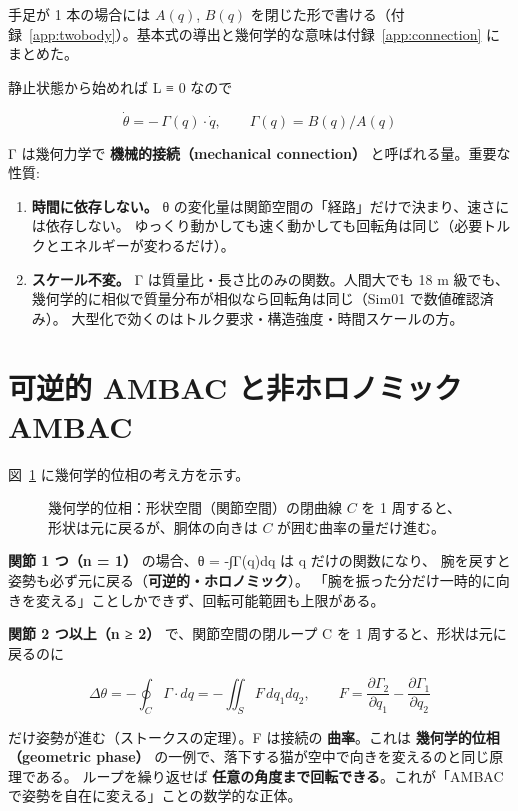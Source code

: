手足が 1 本の場合には $A(q)$, $B(q)$ を閉じた形で書ける（付録~\ref{app:twobody}）。基本式の導出と幾何学的な意味は付録~\ref{app:connection} にまとめた。


静止状態から始めれば L ≡ 0 なので

\[
\boxed{\ \dot\theta = -\,\Gamma(q)\cdot\dot q,\qquad \Gamma(q) = B(q)/A(q)\ }
\]

Γ は幾何力学で \textbf{機械的接続（mechanical connection）} と呼ばれる量。重要な性質:

\begin{enumerate}
\def\labelenumi{\arabic{enumi}.}
\tightlist
\item
  \textbf{時間に依存しない。} θ の変化量は関節空間の「経路」だけで決まり、速さには依存しない。 ゆっくり動かしても速く動かしても回転角は同じ（必要トルクとエネルギーが変わるだけ）。
\item
  \textbf{スケール不変。} Γ は質量比・長さ比のみの関数。人間大でも 18 m 級でも、 幾何学的に相似で質量分布が相似なら回転角は同じ（Sim01 で数値確認済み）。 大型化で効くのはトルク要求・構造強度・時間スケールの方。
\end{enumerate}

\section{可逆的 AMBAC と非ホロノミック AMBAC}

図~\ref{fig:tikz-phase} に幾何学的位相の考え方を示す。

\begin{figure}[htbp]\centering
\resizebox{0.85\linewidth}{!}{}
\caption{幾何学的位相：形状空間（関節空間）の閉曲線 $C$ を 1 周すると、形状は元に戻るが、胴体の向きは $C$ が囲む曲率の量だけ進む。}\label{fig:tikz-phase}
\end{figure}

\textbf{関節 1 つ（n = 1）} の場合、θ = -∫Γ(q)dq は q だけの関数になり、 腕を戻すと姿勢も必ず元に戻る（\textbf{可逆的・ホロノミック}）。 「腕を振った分だけ一時的に向きを変える」ことしかできず、回転可能範囲も上限がある。

\textbf{関節 2 つ以上（n ≥ 2）} で、関節空間の閉ループ C を 1 周すると、形状は元に戻るのに

\[
\Delta\theta = -\oint_C \Gamma\cdot dq = -\iint_S F\,dq_1 dq_2,\qquad
F = \frac{\partial \Gamma_2}{\partial q_1} - \frac{\partial \Gamma_1}{\partial q_2}
\]

だけ姿勢が進む（ストークスの定理）。F は接続の \textbf{曲率}。これは \textbf{幾何学的位相（geometric phase）} の一例で、落下する猫が空中で向きを変えるのと同じ原理である。 ループを繰り返せば \textbf{任意の角度まで回転できる}。これが「AMBAC で姿勢を自在に変える」ことの数学的な正体。

